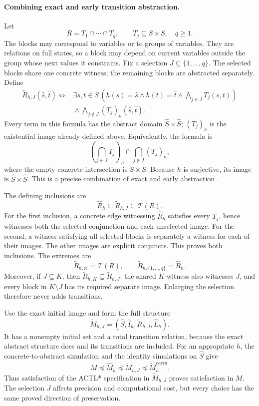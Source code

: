 \paragraph{Combining exact and early transition abstraction.}
Let
\[
 R=T_1\cap\cdots\cap T_q,\qquad T_j\subseteq S\times S,\quad q\geq1.
\]
The blocks may correspond to variables or to groups of variables. They are
relations on full states, so a block may depend on current variables outside
the group whose next values it constrains. Fix a selection
\(J\subseteq\{1,\ldots,q\}\). The selected blocks share one concrete witness;
the remaining blocks are abstracted separately. Define
\[
\begin{split}
 \widetilde R_{h,J}(\widehat s,\widehat t)
 \iff{}&
 \exists s,t\in S\,
 \left(h(s)=\widehat s\land h(t)=\widehat t
       \land\bigwedge_{j\in J}T_j(s,t)\right)\\
 &{}\land
 \bigwedge_{j\notin J}(T_j)_h(\widehat s,\widehat t).
\end{split}
\]
Every term in this formula has the abstract domain
\(\widehat S\times\widehat S\); \((T_j)_h\) is the existential image already
defined above. Equivalently, the formula is
\[
 \left(\bigcap_{j\in J}T_j\right)_h
       \cap\bigcap_{j\notin J}(T_j)_h,
\]
where the empty concrete intersection is \(S\times S\).
Because \(h\) is surjective, its image is
\(\widehat S\times\widehat S\).
This is a precise combination of exact and early abstraction
\cite[\S\S3.1, 6]{ClarkeEtAl2003}.

The defining inclusions are
\[
 \widehat R_h\subseteq\widetilde R_{h,J}\subseteq\mathcal T(R).
\]
For the first inclusion, a concrete edge witnessing \(\widehat R_h\)
satisfies every \(T_j\), hence witnesses both the selected conjunction and
each unselected image. For the second, a witness satisfying all selected
blocks is separately a witness for each of their images. The other images
are explicit conjuncts. This proves both inclusions.
The extremes are
\[
 \widetilde R_{h,\varnothing}=\mathcal T(R),\qquad
 \widetilde R_{h,\{1,\ldots,q\}}=\widehat R_h.
\]
Moreover, if \(J\subseteq K\), then
\(\widetilde R_{h,K}\subseteq\widetilde R_{h,J}\): the shared \(K\)-witness
also witnesses \(J\), and every block in \(K\setminus J\) has its required
separate image. Enlarging the selection therefore never adds transitions.

Use the exact initial image and form the full structure
\[
 \widetilde M_{h,J}
   =(\widehat S,\widehat I_h,\widetilde R_{h,J},\widehat L_h).
\]
It has a nonempty initial set and a total transition relation, because
the exact abstract structure does and its transitions are included.
For an appropriate \(h\), the concrete-to-abstract simulation and the
identity simulations on \(\widehat S\) give
\[
 M\preceq\widehat M_h
   \preceq\widetilde M_{h,J}
   \preceq\widetilde M_h^{early}.
\]
Thus satisfaction of the ACTL* specification in
\(\widetilde M_{h,J}\) proves satisfaction in \(M\).
The selection \(J\) affects precision and computational cost, but every
choice has the same proved direction of preservation.

